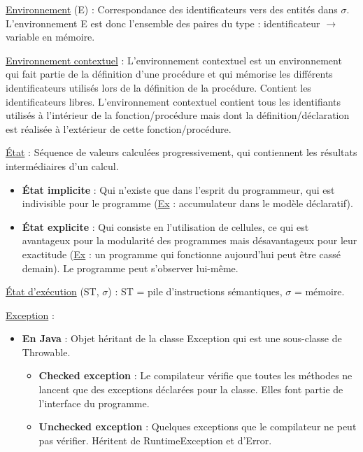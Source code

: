 \documentclass[fr,license=none]{../../../eplsummary}
\begin{document}
\begin{flushleft}
\textcolor{mauvedef}{\underline{Environnement}} (\textcolor{miorangerouge}{E}) : Correspondance des identificateurs vers des entités dans \textcolor{miorangerouge}{$\sigma$}. L’environnement \textcolor{miorangerouge}{E} est donc l'ensemble des paires du type : identificateur $\rightarrow$ variable en mémoire.\bigbreak

\textcolor{mauvedef}{\underline{Environnement contextuel}} : L’environnement contextuel est un environnement qui fait partie de la définition d’une procédure et qui mémorise les différents identificateurs utilisés lors de la définition de la procédure. Contient les identificateurs libres. L'environnement contextuel contient tous les identifiants utilisés à l'intérieur de la fonction/procédure mais dont la définition/déclaration est réalisée à l'extérieur de cette fonction/procédure.  \bigbreak

\textcolor{mauvedef}{\underline{État}} : Séquence de valeurs calculées progressivement, qui contiennent les résultats intermédiaires d'un calcul.
\begin{itemize}
\item \textbf{État implicite} : Qui n'existe que dans l'esprit du programmeur, qui est indivisible pour le programme (\underline{Ex} : accumulateur dans le modèle déclaratif).
\item \textbf{État explicite} : Qui consiste en l'utilisation de cellules, ce qui est avantageux pour la modularité des programmes mais désavantageux pour leur exactitude (\underline{Ex} : un programme qui fonctionne aujourd'hui peut être cassé demain). Le programme peut s'observer lui-même.
\end{itemize}
\bigbreak


\textcolor{mauvedef}{\underline{État d’exécution}} \textcolor{miorangerouge}{(ST, $\sigma$)} : \textcolor{miorangerouge}{ST} = pile d’instructions sémantiques, \textcolor{miorangerouge}{$\sigma$} = mémoire.\bigbreak


\textcolor{mauvedef}{\underline{Exception}} :

\begin{itemize}
\item \textbf{En Java} : Objet héritant de la classe Exception qui est une sous-classe de Throwable.

\begin{itemize}[label=\textbullet]
\item \textbf{Checked exception} : Le compilateur vérifie que toutes les méthodes ne lancent que des exceptions déclarées pour la classe. Elles font partie de l'interface du programme.
\item \textbf{Unchecked exception} : Quelques exceptions que le compilateur ne peut pas vérifier. Héritent de RuntimeException et d'Error.
\end{itemize}


\end{itemize}
\end{flushleft}
\end{document}
